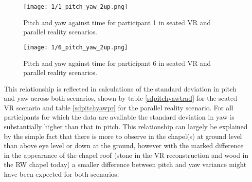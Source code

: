 \begin{figure}
	\begin{center}
	\texttt{[image: 1/1\_pitch\_yaw\_2up.png]}
	\caption{Pitch and yaw against time for participant 1 in seated VR and parallel reality scenarios.}
	\label{1_pitch_yaw_2up.png}
	\end{center}
\end{figure}


\begin{figure}
	\begin{center}
	\texttt{[image: 1/6\_pitch\_yaw\_2up.png]}
	\caption{Pitch and yaw against time for participant 6 in seated VR and parallel reality scenarios.}
	\label{6_pitch_yaw_2up.png}
	\end{center}
\end{figure}

This relationship is reflected in calculations of the standard deviation in pitch and yaw across both scenarios, shown by table \ref{sdpitchyawtrad} for the seated VR scenario and table \ref{sdpitchyawpr} for the parallel reality scenario. For all participants for which the data are available the standard deviation in yaw is substantially higher than that in pitch. This relationship can largely be explained by the simple fact that there is more to observe in the chapel(s) at ground level than above eye level or down at the ground, however with the marked difference in the appearance of the chapel roof (stone in the VR reconstruction and wood in the RW chapel today) a smaller difference between pitch and yaw variance might have been expected for both scenarios.

